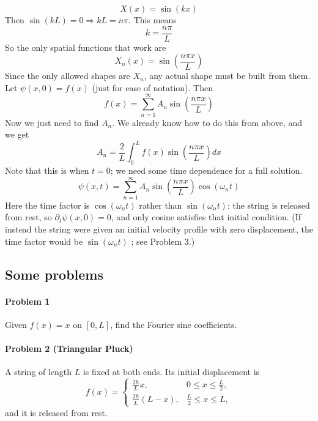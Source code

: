 \documentclass{report}
\numberwithin{equation}{section}
\begin{document}
\begin{equation}
	X(x) = \sin(kx)
\end{equation}
Then $\sin(kL) = 0 \Rightarrow kL = n\pi$. This means
\begin{equation}
	k = \frac{n\pi}{L}
\end{equation}
So the only spatial functions that work are
\begin{equation}
	X_n(x) = \sin\left(\frac{n\pi x}{L}\right)
\end{equation}
Since the only allowed shapes are $X_n$, any actual shape must be built from them. Let $\psi(x,0) = f(x)$ (just for ease of notation). Then
\begin{equation}
	f(x) = \sum^{\infty}_{n=1} A_n\sin\left(\frac{n\pi x}{L}\right)
\end{equation}
Now we just need to find $A_n$. We already know how to do this from above, and we get
\begin{equation}
	A_n = \frac{2}{L}\int_0^L f(x)\sin\left(\frac{n\pi x}{L}\right)dx
\end{equation}
Note that this is when $t=0$; we need some time dependence for a full solution.
\begin{equation}
	\psi(x,t) = \sum^{\infty}_{n=1} A_n\sin\left(\frac{n\pi x}{L}\right)\cos(\omega_n t)
\end{equation}
Here the time factor is $\cos(\omega_n t)$ rather than $\sin(\omega_n t)$: the string is released from rest, so $\partial_t\psi(x,0)=0$, and only cosine satisfies that initial condition. (If instead the string were given an initial velocity profile with zero displacement, the time factor would be $\sin(\omega_n t)$ ; see Problem 3.)
\subsection{Some problems}
\paragraph{Problem 1} Given $f(x) = x$ on $[0,L]$, find the Fourier sine coefficients.
\paragraph{Problem 2 (Triangular Pluck)} A string of length $L$ is fixed at both ends. Its initial displacement is
\[
f(x)=
\begin{cases}
\frac{2h}{L}x, & 0 \le x \le \frac{L}{2},\\
\frac{2h}{L}(L-x), & \frac{L}{2} \le x \le L,
\end{cases}
\]
and it is released from rest.
\end{document}
